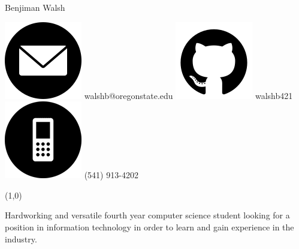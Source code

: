 \documentclass[12pt,letterpaper]{article}
\begin{document}
	\centering
	{\huge
		Benjiman Walsh
	}

	\vspace{0.5cm}

	\includegraphics[scale=0.15]{./images/email_icon}
	walshb@oregonstate.edu
	\hspace{1cm}
	\includegraphics[scale=0.15]{./images/github_icon}
	walshb421 
	\hspace{1cm}
	\includegraphics[scale=0.15]{./images/phone_icon}
	(541) 913-4202

	\noindent
	\line(1,0){\textwidth}
	
	
	\raggedright

	Hardworking and versatile fourth year computer science student looking for a position
	in information technology in order to learn and gain experience in the industry.
	
	\hspace{1cm}
	
\end{document}
